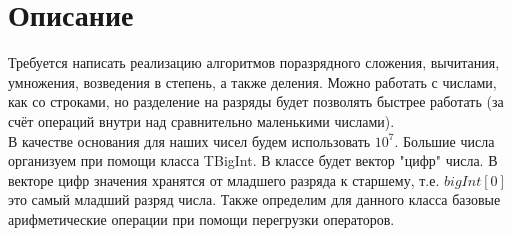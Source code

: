 \section{Описание}
Требуется написать реализацию алгоритмов поразрядного сложения, вычитания, умножения, возведения в степень, а также деления.
Можно работать с числами, как со строками, но разделение на разряды будет  позволять быстрее работать (за счёт 
операций внутри над сравнительно маленькими числами). 
\\ В качестве основания для наших чисел будем использовать
$10^{7}$. Большие числа организуем при помощи класса TBigInt. В классе будет вектор "цифр" числа.
В векторе цифр значения хранятся от младшего разряда к старшему, т.е. $bigInt[0]$ это самый младший разряд числа. 
Также определим для данного класса базовые арифметические операции при помощи перегрузки операторов.
\pagebreak

